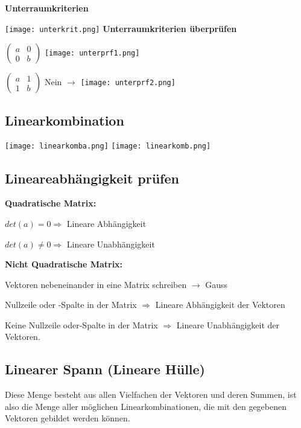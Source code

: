 \begin{multicols*}{3}
    {\textbf{Unterraumkriterien}}

    \texttt{[image: unterkrit.png]}
    {\textbf{Unterraumkriterien überprüfen} }

    {$ \begin{pmatrix}
                a & 0 \\
                0 & b
            \end{pmatrix} $
        \texttt{[image: unterprf1.png]}}

    {$ \begin{pmatrix}
                a & 1 \\
                1 & b
            \end{pmatrix} $
        {Nein $\rightarrow$}
        \texttt{[image: unterprf2.png]}}







    \subsection{Linearkombination}
    {\texttt{[image: linearkomba.png]}}
    {\texttt{[image: linearkomb.png]}}
    \subsection{Lineareabhängigkeit prüfen}
    {\textbf{Quadratische Matrix:} }

    {$det(a) = 0 \Rightarrow$ Lineare Abhängigkeit}

    {$det(a) \neq 0 \Rightarrow$  Lineare Unabhängigkeit}

    {\textbf{Nicht Quadratische Matrix:} }

    { Vektoren nebeneinander in eine Matrix schreiben $\rightarrow$ Gauss  }

    { {\small Nullzeile oder -Spalte in der Matrix} $\Longrightarrow$ Lineare Abhängigkeit der Vektoren}

    { {\small Keine Nullzeile oder-Spalte in der Matrix} $\Longrightarrow$ Lineare Unabhängigkeit der Vektoren.}
    \subsection{Linearer Spann (Lineare Hülle)}
    {Diese Menge besteht aus allen Vielfachen der Vektoren und deren Summen, ist also die Menge aller möglichen Linearkombinationen, die mit den gegebenen Vektoren gebildet werden können.}


\end{multicols*}
